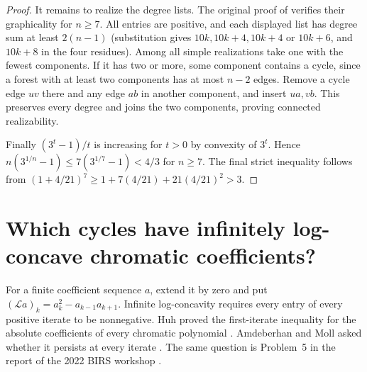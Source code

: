 \documentclass[11pt,a4paper]{article}
\theoremstyle{definition}\newtheorem{problem}[theorem]{Problem}
\begin{document}
\begin{proof}
It remains to realize the degree lists. The original
proof of \cite[Theorem~9]{ksfd} verifies their graphicality for $n\ge7$.
All entries are positive, and each displayed list has degree sum at least
$2(n-1)$ (substitution gives $10k,10k+4,10k+4$ or $10k+6$,
and $10k+8$ in the four residues).
Among all simple realizations take one with the fewest components.
If it has two or more, some component contains a cycle, since a forest
with at least two components has at most $n-2$ edges. Remove a cycle edge
$uv$ there and any edge $ab$ in another component, and insert $ua,vb$.
This preserves every degree and joins the two components, proving
connected realizability.

Finally $(3^t-1)/t$ is increasing for $t>0$ by convexity of $3^t$.
Hence $n(3^{1/n}-1)\le7(3^{1/7}-1)<4/3$ for $n\ge7$.
The final strict inequality follows from
$(1+4/21)^7\ge1+7(4/21)+21(4/21)^2>3$.
\end{proof}
\section{Which cycles have infinitely log-concave chromatic coefficients?}
\label{sec:cycles}
For a finite coefficient sequence $a$, extend it by zero and put
$(\mathcal La)_k=a_k^2-a_{k-1}a_{k+1}$. Infinite log-concavity requires
every entry of every positive iterate to be nonnegative. Huh proved
the first-iterate inequality for the absolute coefficients of every
chromatic polynomial \cite{huh}. Amdeberhan and Moll asked whether it
persists at every iterate \cite[Conjecture 21]{am}. The same question
is Problem~5 in the report of the 2022 BIRS workshop \cite{birs}.
\end{document}
